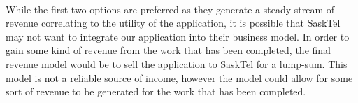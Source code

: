 \documentclass[12pt]{article}
\begin{document}
\paragraph{}
While the first two options are preferred as they generate a steady stream of revenue correlating to the utility of the application, it is possible that SaskTel may not want to integrate our application into their business model. In order to gain some kind of revenue from the work that has been completed, the final revenue model would be to sell the application to SaskTel for a lump-sum. This model is not a reliable source of income, however the model could allow for some sort of revenue to be generated for the work that has been completed.
\end{document}
